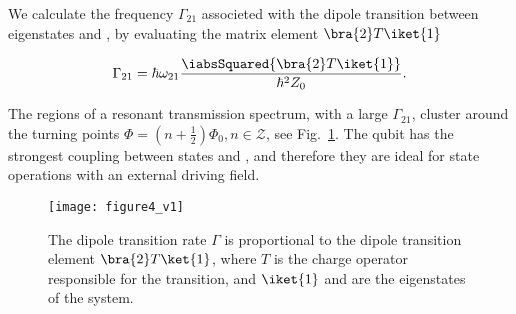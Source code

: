  \noindent We calculate the frequency $ \Gamma_{21} $ associeted with the dipole transition between eigenstates  and , by evaluating the matrix element $ \bra{2}T\iket{1} $

 
	\begin{equation}\label{key}
	\Gamma_{21} = \hbar\omega_{21}\frac{\iabsSquared{\bra{2}T\iket{1}}}{\hbar^2Z_0}.
	\end{equation}
 
 \noindent The regions of a resonant transmission spectrum, with a large $ \Gamma_{21} $, cluster around the turning points $ \Phi = (n+\frac{1}{2})\Phi_0, n\in\mathcal{Z} $, see Fig.~\ref{fig:dipole_transition}. The qubit has the strongest coupling between states  and , and therefore they are ideal for state operations with an external driving field.
 \begin{figure}
	\centering
 		\texttt{[image: figure4\_v1]}
 	\caption{The dipole transition rate $ \Gamma $ is proportional to the dipole transition element $ \bra{2}T\ket{1} $, where $ T $ is the charge operator responsible for the transition, and $ \iket{1} $ and  are the eigenstates of the system. %
 		\label{fig:dipole_transition}}
 \end{figure}
